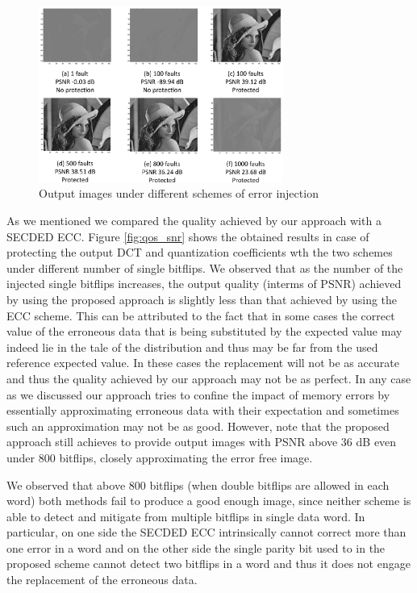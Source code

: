 \begin{figure}
\centering
\includegraphics[width=80mm]{./eps/qos_lena}
\caption{Output images under different schemes of error injection}
\vspace{-4mm}
\label{fig:qos_lena}
\end{figure}

As we mentioned we compared the quality achieved by our approach with a SECDED ECC.   
Figure \ref{fig:qos_snr} shows the obtained results in case of protecting the output DCT and quantization coefficients wth the two schemes under different number of single bitflips.  We observed that as the number of the injected single bitflips increases, the output quality (interms of PSNR) achieved by using the proposed approach is slightly less than that achieved by using the ECC scheme. This can be attributed to the fact that in some cases the correct value of the erroneous data that is being substituted by the expected value may indeed lie in the tale of the distribution and thus may be far from the used reference expected value. In these cases the replacement will not be as accurate and thus the quality achieved by our approach may not be as perfect. In any case as we discussed our approach tries to confine the impact of memory errors by essentially approximating erroneous data with their expectation and sometimes such an approximation may not be as good. However, note that the proposed approach still achieves to provide output images with PSNR above 36 dB even under 800 bitflips, closely approximating the error free image.

We observed that above 800 bitflips (when double bitflips are allowed in each word) both methods fail to produce a good enough   image, since neither scheme is able to detect and mitigate from multiple bitflips in single data word. In particular, on one side the SECDED ECC intrinsically cannot correct more than one error in a word and on the other side the single parity bit used to in the proposed scheme cannot detect two bitflips in a word and thus it does not engage the replacement of the erroneous data.

